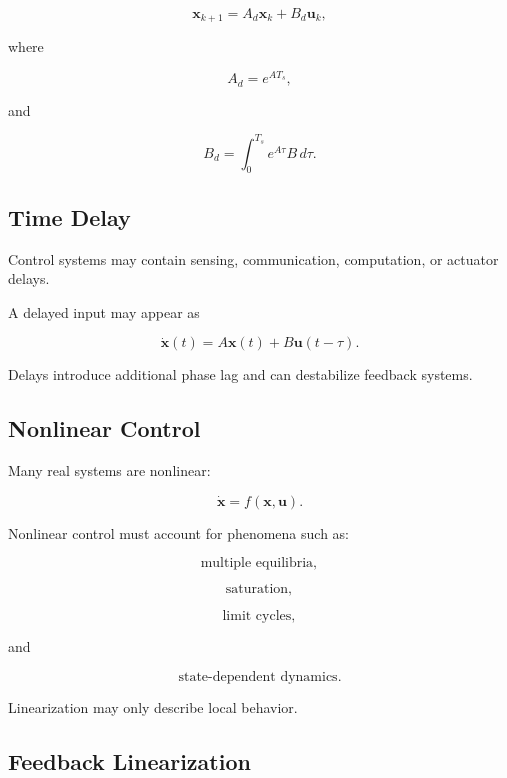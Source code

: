 \[
\boxed{
\mathbf{x}_{k+1}
=
A_d\mathbf{x}_k
+
B_d\mathbf{u}_k,
}
\]

where

\[
\boxed{
A_d
=
e^{AT_s},
}
\]

and

\[
\boxed{
B_d
=
\int_0^{T_s}
e^{A\tau}B\,d\tau.
}
\]

\subsection{Time Delay}
\label{subsec:control-time-delay}

Control systems may contain sensing, communication, computation, or actuator
delays.

A delayed input may appear as

\[
\boxed{
\dot{\mathbf{x}}(t)
=
A\mathbf{x}(t)
+
B\mathbf{u}(t-\tau).
}
\]

Delays introduce additional phase lag and can destabilize feedback systems.

\subsection{Nonlinear Control}
\label{subsec:nonlinear-control}

Many real systems are nonlinear:

\[
\boxed{
\dot{\mathbf{x}}
=
f(\mathbf{x},\mathbf{u}).
}
\]

Nonlinear control must account for phenomena such as:

\[
\boxed{
\text{multiple equilibria},
}
\]

\[
\boxed{
\text{saturation},
}
\]

\[
\boxed{
\text{limit cycles},
}
\]

and

\[
\boxed{
\text{state-dependent dynamics}.
}
\]

Linearization may only describe local behavior.

\subsection{Feedback Linearization}
\label{subsec:feedback-linearization}

